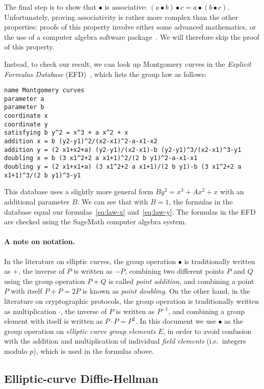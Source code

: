 \documentclass[manuscript]{acmart}
\begin{document}
The final step is to show that $\bullet$ is associative: $(a \bullet b) \bullet c = a \bullet (b \bullet c)$.
Unfortunately, proving associativity is rather more complex than the other properties: proofs of this property involve either some advanced mathematics, or the use of a computer algebra software package~\cite{Friedl:2017js,Fujii:2017eb}.
We will therefore skip the proof of this property.

Instead, to check our result, we can look up Montgomery curves in the \emph{Explicit Formulas Database} (EFD)~\cite{MontgomeryEFD}, which lists the group law as follows:
\begin{verbatim}
name Montgomery curves
parameter a
parameter b
coordinate x
coordinate y
satisfying b y^2 = x^3 + a x^2 + x
addition x = b (y2-y1)^2/(x2-x1)^2-a-x1-x2
addition y = (2 x1+x2+a) (y2-y1)/(x2-x1)-b (y2-y1)^3/(x2-x1)^3-y1
doubling x = b (3 x1^2+2 a x1+1)^2/(2 b y1)^2-a-x1-x1
doubling y = (2 x1+x1+a) (3 x1^2+2 a x1+1)/(2 b y1)-b (3 x1^2+2 a x1+1)^3/(2 b y1)^3-y1
\end{verbatim}
This database uses a slightly more general form $B y^2 = x^3 + A x^2 + x$ with an additional parameter $B$.
We can see that with $B=1$, the formulas in the database equal our formulas~\eqref{eq:law-x} and~\eqref{eq:law-y}.
The formulas in the EFD are checked using the SageMath computer algebra system.

\paragraph{A note on notation.}
In the literature on elliptic curves, the group operation $\bullet$ is traditionally written as $+$, the inverse of $P$ is written as $-P$, combining two different points $P$ and $Q$ using the group operation $P+Q$ is called \emph{point addition}, and combining a point $P$ with itself $P+P=2P$ is known as \emph{point doubling}.
On the other hand, in the literature on cryptographic protocols, the group operation is traditionally written as multiplication $\cdot$, the inverse of $P$ is written as $P^{-1}$, and combining a group element with itself is written as $P \cdot P = P^2$.
In this document we use $\bullet$ as the group operation on \emph{elliptic curve group elements} $E$, in order to avoid confusion with the addition and multiplication of individual \emph{field elements} (i.e.\ integers modulo $p$), which is used in the formulas above.

\subsection{Elliptic-curve Diffie-Hellman}\label{sec:ecdh}
\end{document}
